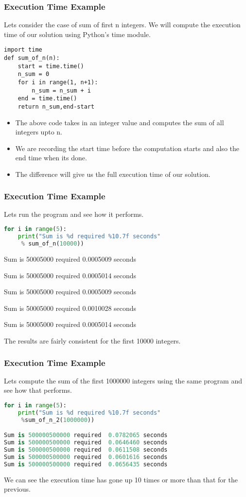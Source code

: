 \documentclass{beamer}
\begin{document}
\begin{frame}[fragile]
\frametitle{Execution Time Example}
Lets consider the case of sum of first n integers. We will compute the execution time of our solution using Python's time module.

\begin{lstlisting}
import time
def sum_of_n(n):
    start = time.time()
    n_sum = 0
    for i in range(1, n+1):
        n_sum = n_sum + i
    end = time.time()
    return n_sum,end-start
\end{lstlisting}
\begin{itemize}
\item The above code takes in an integer value and computes the sum of all integers upto n.
\item We are recording the start time before the computation starts and also the end time when its done.
\item The difference will give us the full execution time of our solution.
\end{itemize}

\end{frame}

\begin{frame}[fragile]
\frametitle{Execution Time Example}
Lets run the program and see how it performs.
\begin{lstlisting}[language=python, showstringspaces=false]
for i in range(5):
    print("Sum is %d required %10.7f seconds"
     % sum_of_n(10000))

\end{lstlisting}
Sum is 50005000 required  0.0005009 seconds

Sum is 50005000 required  0.0005014 seconds

Sum is 50005000 required  0.0005009 seconds

Sum is 50005000 required  0.0010028 seconds

Sum is 50005000 required  0.0005014 seconds

The results are fairly consistent for the first 10000 integers.
\end{frame}

\begin{frame}[fragile]
\frametitle{Execution Time Example}
Lets compute the sum of the first 1000000 integers using the same program and see how that performs.
\begin{lstlisting}[language=python, showspaces=false]
for i in range(5):
    print("Sum is %d required %10.7f seconds"
     %sum_of_n_2(1000000))

Sum is 500000500000 required  0.0782065 seconds
Sum is 500000500000 required  0.0646460 seconds
Sum is 500000500000 required  0.0611508 seconds
Sum is 500000500000 required  0.0601616 seconds
Sum is 500000500000 required  0.0656435 seconds
\end{lstlisting}
We can see the execution time has gone up 10 times or more than that for the previous.
\end{frame}
\end{document}
